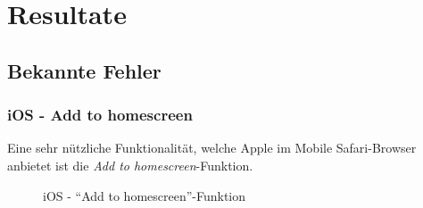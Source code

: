 \section{Resultate}

\subsection{Bekannte Fehler}

\subsubsection{iOS - Add to homescreen}
Eine sehr nützliche Funktionalität, welche Apple im Mobile Safari-Browser anbietet ist die \emph{Add to homescreen}-Funktion.

\begin{figure}[H]
\hfill
{}
\hfill
{}
\hfill
{}
\caption{iOS - "`Add to homescreen"'-Funktion}
\end{figure}

